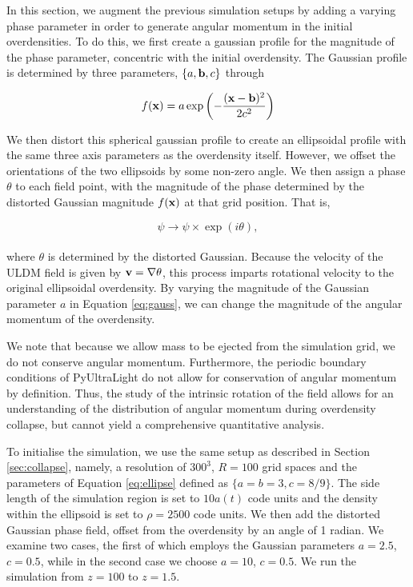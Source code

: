 \documentclass[a4paper,11pt]{article}
\begin{document}
In this section, we augment the previous simulation setups by adding a varying phase parameter in order to generate angular momentum in the initial overdensities. To do this, we first create a gaussian profile for the magnitude of the phase parameter, concentric with the initial overdensity. The Gaussian profile is determined by three parameters, $\{a, \bold{b}, c\}$ through

\begin{equation}\label{eq:gauss}
    f(\bold{x}) = a\exp\left(-\frac{(\bold{x}-\bold{b})^2}{2c^2}\right)    
\end{equation}

We then distort this spherical gaussian profile to create an ellipsoidal profile with the same three axis parameters as the overdensity itself. However, we offset the orientations of the two ellipsoids by some non-zero angle. We then assign a phase $\theta$ to each field point, with the magnitude of the phase determined by the distorted Gaussian magnitude $f(\bold{x})$ at that grid position. That is,  

\begin{equation}
    \psi \rightarrow \psi \times \exp(i\theta),
\end{equation}
\\
where $\theta$ is determined by the distorted Gaussian. Because the velocity of the ULDM field is given by $\bold{v} = \bold{\nabla} \theta$, this process imparts rotational velocity to the original ellipsoidal overdensity. By varying the magnitude of the Gaussian parameter $a$ in Equation \ref{eq:gauss}, we can change the magnitude of the angular momentum of the overdensity.

We note that because we allow mass to be ejected from the simulation grid, we do not conserve angular momentum. Furthermore, the periodic boundary conditions of {\sc PyUltraLight} do not allow for conservation of  angular momentum by definition. Thus, the study of the intrinsic rotation of the field allows for an understanding of the distribution of angular momentum during overdensity collapse, but cannot yield a comprehensive quantitative analysis.

To initialise the simulation, we use the same setup as described in Section \ref{sec:collapse}, namely, a resolution of $300^3$, $R = 100$ grid spaces and the parameters of Equation \ref{eq:ellipse} defined as $\{a = b = 3, c = 8/9\}$. The side length of the simulation region is set to $10a(t)$ code units and the density within the ellipsoid is set to $\rho = 2500$ code units.
We then add the distorted Gaussian phase field, offset from the overdensity by an angle of 1 radian. We examine two cases, the first of which employs the Gaussian parameters $a = 2.5$, $c = 0.5$, while in the second case we choose $a = 10$, $c = 0.5$. We run the simulation from $z = 100$ to $z = 1.5$.
\end{document}
